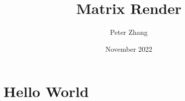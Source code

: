 \documentclass{article}
\title{Matrix Render}
\author{Peter Zhang}
\date{November 2022}
\begin{document}
\maketitle

\section{Hello World}
\end{document}
